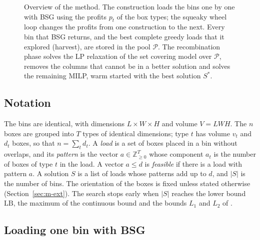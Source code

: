 \begin{figure}[t]
\caption{Overview of the method. The construction loads the bins one by one with BSG using the
profits $p_t$ of the box types; the squeaky wheel loop changes the profits from one construction
to the next. Every bin that BSG returns, and the best complete greedy loads that it explored
(harvest), are stored in the pool $\mathcal{P}$. The recombination phase solves the LP
relaxation of the set covering model over $\mathcal{P}$, removes the columns that cannot be in a
better solution and solves the remaining MILP, warm started with the best solution $S^*$.}
\label{fig:overview}
\end{figure}

\subsection{Notation}
\label{sec:m-notation}

The bins are identical, with dimensions $L\times W\times H$ and volume $V=LWH$. The $n$ boxes are
grouped into $T$ types of identical dimensions; type $t$ has volume $v_t$ and $d_t$ boxes, so
that $n=\sum_t d_t$. A \emph{load} is a set of boxes placed in a bin without overlaps, and its
\emph{pattern} is the vector $a\in\mathbb{Z}_{\ge 0}^{T}$ whose component $a_t$ is the number of
boxes of type $t$ in the load. A vector $a\le d$ is \emph{feasible} if there is a load with
pattern $a$. A solution $S$ is a list of loads whose patterns add up to $d$, and $|S|$ is the
number of bins. The orientation of the boxes is fixed unless stated otherwise
(Section~\ref{sec:m-ext}). The search stops early when $|S|$ reaches the lower bound $\mathrm{LB}$,
the maximum of the continuous bound and the bounds $L_1$ and $L_2$ of \citet{Martello2000}.

\subsection{Loading one bin with BSG}
\label{sec:m-bsg}


